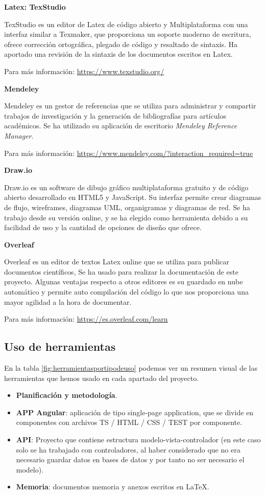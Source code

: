 \textbf{Latex: TexStudio}

TexStudio es un editor de Latex de código abierto y Multiplataforma con una interfaz similar a Texmaker, que proporciona un soporte moderno de escritura, ofrece corrección ortográfica, plegado de código y resaltado de sintaxis. Ha aportado una revisión de la sintaxis de los documentos escritos en Latex.

Para más información: \url{https://www.texstudio.org/}


\textbf{Mendeley}

Mendeley es un gestor de referencias que se utiliza para administrar y compartir trabajos de investigación y la generación de bibliografías para artículos académicos. Se ha utilizado su aplicación de escritorio  \textit{Mendeley Reference Manager}.

Para más información: \url{https://www.mendeley.com/?interaction_required=true}


\textbf{Draw.io}

Draw.io es un software de dibujo gráfico  multiplataforma  gratuito y de código abierto desarrollado en HTML5 y JavaScript. Su interfaz permite crear diagramas de flujo, wireframes, diagramas UML, organigramas y diagramas de red. Se ha trabajo desde su versión online, y se ha elegido como  herramienta debido a su facilidad de uso y la cantidad de opciones de diseño que ofrece.

\textbf{Overleaf}

Overleaf es un  editor de textos Latex online que se utiliza para publicar documentos científicos, Se ha usado para realizar la documentación de este proyecto. Algunas ventajas respecto a otros editores es su  guardado en nube automático y permite auto compilación del código lo que nos proporciona una mayor agilidad a la hora de documentar.

Para más información: \url{https://es.overleaf.com/learn}

\subsection{Uso de herramientas}

En la tabla \ref{fig:herramientasportipodeuso} podemos ver un resumen visual de las herramientas que hemos usado en cada apartado del proyecto.

\begin{itemize}
	\item \textbf{Planificación y metodología}.
	\item \textbf{APP Angular}: aplicación de tipo single-page application, que se divide en componentes con archivos TS / HTML / CSS / TEST por componente.
	\item \textbf{API}: Proyecto que contiene estructura modelo-vista-controlador (en este caso solo se ha  trabajado con controladores, al haber considerado que no era necesario guardar datos en bases de datos y por tanto no ser necesario el modelo).
	\item \textbf{Memoria}: documentos memoria y anexos escritos en \LaTeX{}.
\end{itemize}

